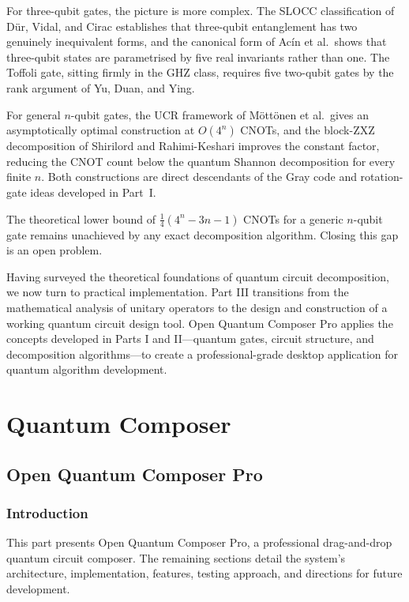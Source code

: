\documentclass[12pt, a4paper, oneside]{report}
\theoremstyle{plain}
\theoremstyle{definition}
\theoremstyle{remark}
\begin{document}
For three-qubit gates, the picture is more complex. The SLOCC classification of Dür, Vidal,
and Cirac establishes that three-qubit entanglement has two genuinely inequivalent forms,
and the canonical form of Acín et al.\ shows that three-qubit states are parametrised by
five real invariants rather than one. The Toffoli gate, sitting firmly in the GHZ class,
requires five two-qubit gates by the rank argument of Yu, Duan, and Ying.

For general $n$-qubit gates, the UCR framework of Möttönen et al.\ gives an asymptotically
optimal construction at $O(4^n)$ CNOTs, and the block-ZXZ decomposition of Shirilord and
Rahimi-Keshari improves the constant factor, reducing the CNOT count below the quantum
Shannon decomposition for every finite $n$. Both constructions are direct descendants of the
Gray code and rotation-gate ideas developed in Part~I.

The theoretical lower bound of $\frac{1}{4}(4^n - 3n - 1)$ CNOTs for a generic $n$-qubit
gate remains unachieved by any exact decomposition algorithm. Closing this gap is an open
problem.


Having surveyed the theoretical foundations of quantum circuit decomposition, we now turn to practical implementation. Part III transitions from the mathematical analysis of unitary operators to the design and construction of a working quantum circuit design tool. Open Quantum Composer Pro applies the concepts developed in Parts I and II---quantum gates, circuit structure, and decomposition algorithms---to create a professional-grade desktop application for quantum algorithm development. 


\part{Quantum Composer}

\chapter{Open Quantum Composer Pro}
\section{Introduction}

This part presents Open Quantum Composer Pro, a professional drag-and-drop quantum circuit composer. The remaining sections detail the system's architecture, implementation, features, testing approach, and directions for future development.
\end{document}
